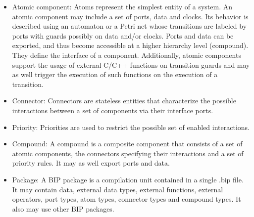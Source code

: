 \begin{itemize}
  \item Atomic component: Atoms represent the simplest entity of a system. An atomic component
    may include a set of ports, data and clocks. Its behavior is described using an 
    automaton or a Petri net whose transitions are labeled by ports with guards possibly on data 
    and/or clocks. Ports and data can be exported, and thus become accessible at a higher
    hierarchy level (compound). They define the interface of a component.
    Additionally, atomic components support the usage of external C/C++ functions on
    transition guards and may as well trigger the execution of such functions on the
    execution of a transition. 
  \item Connector: Connectors are stateless entities that characterize the possible interactions
    between a set of components via their interface ports.
  \item Priority: Priorities are used to restrict the possible set of enabled interactions.
  \item Compound: A compound is a composite component that consists of a set of atomic 
    components, the connectors specifying their interactions and a set of priority rules. It
    may as well export ports and data.
  \item Package: A BIP package is a compilation unit contained in a single .bip file. It may
    contain data, external data types, external functions, external operators, port types,
    atom types, connector types and compound types. It also may use other BIP packages.
\end{itemize}

